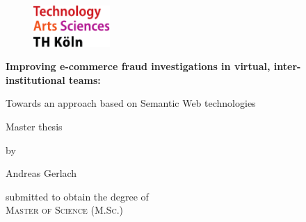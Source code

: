 
\begin{titlepage}

\begin{center}

\begin{figure}[!ht]
		\includegraphics[width=0.26\textwidth]{images/THlogoheader.pdf}
\end{figure}

\vspace{0.8cm}

\begin{rmfamily}
\begin{huge}
\textbf{Improving e-commerce fraud investigations in virtual, inter-institutional teams:}\\
\end{huge}
\vspace{0.5cm}
\begin{LARGE}
Towards an approach based on Semantic Web technologies
\end{LARGE}
\end{rmfamily}

\vspace{1cm}


\begin{LARGE}
\begin{scshape}
Master thesis\\[0.8em]
\end{scshape}
\end{LARGE}

\begin{large}
by\\
\vspace{0.2cm}
\begin{LARGE}
Andreas Gerlach\\
\end{LARGE}
\end{large}

\vspace{1.0cm}

\begin{large}
submitted to obtain the degree of\\
\vspace{0.4cm}
\textsc{Master of Science (M.Sc.)}\\
\end{large}


\end{center}
\end{titlepage}
